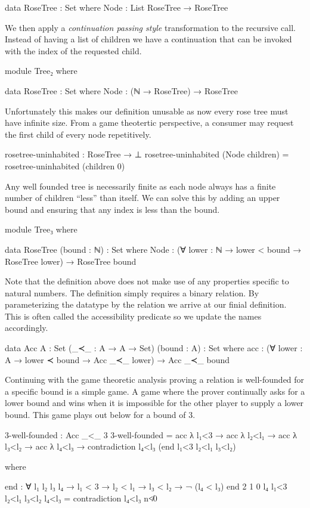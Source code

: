 \documentclass[./Thesis.tex]{subfiles}
\begin{document}
\begin{code}
    data RoseTree : Set where
      Node : List RoseTree → RoseTree
\end{code}
We then apply a \textit{continuation passing style} \cite{harper} transformation to the
recursive call. Instead of having a list of children we have a continuation that
can be invoked with the index of the requested child.
\begin{code}[hide]
  module Tree₂ where
\end{code}
\begin{code}
    data RoseTree : Set where
      Node : (ℕ → RoseTree) → RoseTree
\end{code}
Unfortunately this makes our definition unusable as now every rose tree must have
infinite size. From a game theotertic perspective, a consumer may request
the first child of every node repetitively.
\begin{code}
    rosetree-uninhabited : RoseTree → ⊥
    rosetree-uninhabited (Node children) = rosetree-uninhabited (children 0)
\end{code}
Any well founded tree is necessarily finite as each node always has a finite
number of children ``less'' than itself. We can solve this by adding an upper
bound and ensuring that any index is less than the bound.
\begin{code}[hide]
  module Tree₃ where
\end{code}
\begin{code}
    data RoseTree (bound : ℕ) : Set where
      Node : (∀ {lower : ℕ} → lower < bound → RoseTree lower)
           → RoseTree bound
\end{code}
Note that the definition above does not make use of any properties specific to
natural numbers. The definition simply requires a binary relation.
By parameterizing the datatype by the relation we
arrive at our finial definition. This is often called the accessibility
predicate so we update the names accordingly.
\begin{code}
  data Acc {A : Set} (_≺_ : A → A → Set) (bound : A) : Set where
    acc : (∀ {lower : A} → lower ≺ bound → Acc _≺_ lower)
        → Acc _≺_ bound
\end{code}
Continuing with the game theoretic analysis proving a relation is well-founded
for a specific bound is a simple game. A game where the prover
continually asks for a lower bound and wins when it is impossible for the
other player to supply a lower bound. This game plays out below for a bound of $3$.
\begin{code}
  3-well-founded : Acc _<_ 3
  3-well-founded = acc λ l₁<3 → acc λ l₂<l₁ → acc λ l₃<l₂ → acc λ l₄<l₃ →
    contradiction l₄<l₃ (end l₁<3 l₂<l₁ l₃<l₂)
\end{code}
\begin{code}[hide]
    where
\end{code}
\begin{code}
    end : ∀ {l₁ l₂ l₃ l₄} → l₁ < 3 → l₂ < l₁ → l₃ < l₂ → ¬ (l₄ < l₃)
    end {2} {1} {0} {l₄} l₁<3 l₂<l₁ l₃<l₂ l₄<l₃ = contradiction l₄<l₃ n≮0 
\end{code}
\end{document}
